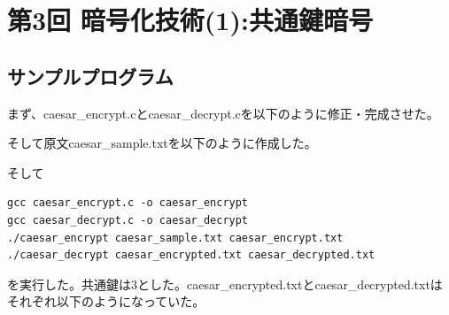 \documentclass[a4j]{celb-report}
\begin{document}
\newpage
\section{第3回 暗号化技術(1):共通鍵暗号}
\subsection{サンプルプログラム}
まず、caesar\_encrypt.cとcaesar\_decrypt.cを以下のように修正・完成させた。


そして原文caesar\_sample.txtを以下のように作成した。

そして
\begin{lstlisting}[basicstyle=\ttfamily\footnotesize, frame=single]
gcc caesar_encrypt.c -o caesar_encrypt
gcc caesar_decrypt.c -o caesar_decrypt
./caesar_encrypt caesar_sample.txt caesar_encrypt.txt
./caesar_decrypt caesar_encrypted.txt caesar_decrypted.txt
\end{lstlisting}
を実行した。共通鍵は3とした。caesar\_encrypted.txtとcaesar\_decrypted.txtはそれぞれ以下のようになっていた。


\end{document}
